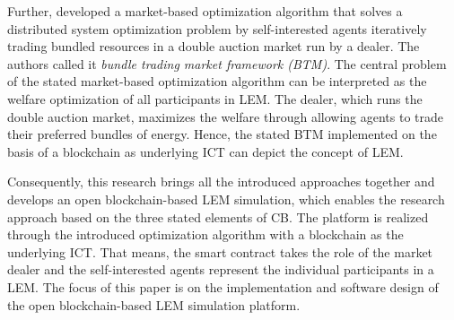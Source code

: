 Further,  developed a market-based optimization algorithm
that solves a distributed system optimization problem by self-interested agents iteratively 
trading bundled resources in a double auction market run by a dealer. The authors called it 
\textit{bundle trading market framework (BTM)}. The central problem of the stated market-based 
optimization algorithm can be interpreted as the welfare optimization of all participants in LEM. 
The dealer, which runs the double auction market, maximizes the welfare through allowing agents 
to trade their preferred bundles of energy. Hence, the stated BTM implemented on the basis of a 
blockchain as underlying ICT can depict the concept of LEM.

Consequently, this research brings all the introduced approaches together 
and develops an open blockchain-based LEM simulation, which enables the research 
approach based on the three stated elements of CB. The platform is realized through 
the introduced optimization algorithm with a blockchain as the underlying ICT. 
That means, the smart contract takes the role of the market dealer and the self-interested 
agents represent the individual participants in a LEM. The focus of this paper is on the 
implementation and software design of the open blockchain-based LEM simulation platform.

\clearpage